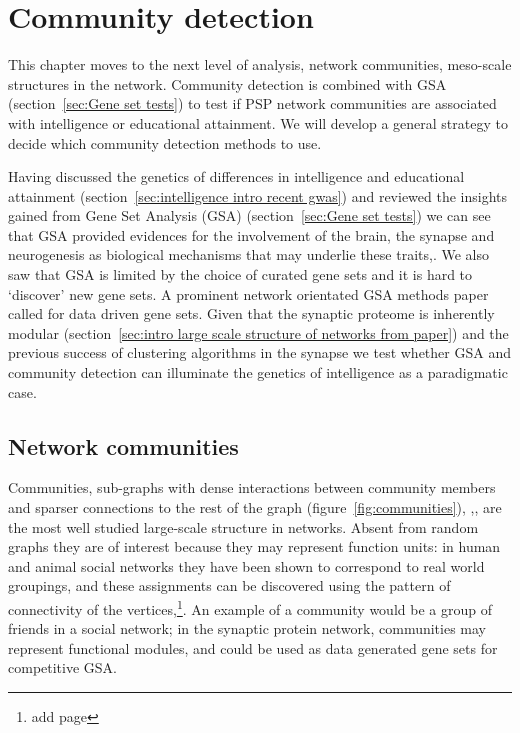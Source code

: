 
\chapter{Community detection}
\label{chap:community detection}

This chapter moves to the next level of analysis, network communities, meso-scale structures in the network. Community detection is combined with  GSA (section~\ref{sec:Gene set tests}) to test if  PSP network communities are associated with intelligence or educational attainment. We will develop a general strategy to decide which community detection methods to use. 

Having discussed the genetics of differences in intelligence and educational attainment (section~\ref{sec:intelligence intro recent gwas}) and reviewed the insights gained from Gene Set Analysis (GSA) (section~\ref{sec:Gene set tests}) we can see that GSA provided evidences for the involvement of the brain, the synapse and neurogenesis as biological mechanisms that may underlie these traits\cite{hill2014functional},\cite{hill2019combined}. We also saw that GSA is limited by the choice of curated gene sets and it is hard to `discover' new gene sets. A prominent network orientated GSA methods paper called for data driven gene sets\cite{lamparter2016fast}. Given that the synaptic proteome is inherently modular (section~\ref{sec:intro large scale structure of networks from paper}) and the previous success of clustering algorithms in the synapse we test whether GSA and community detection can illuminate the genetics of intelligence as a paradigmatic case. 





\section{Network communities}
\label{sec: community detection intro gsa}


Communities, sub-graphs with dense interactions between community members and sparser connections to the rest of the graph (figure~\ref{fig:communities}), \cite{newman2012communities},\cite{fortunato2016community},\cite{girvan2002community} are the most well studied large-scale structure in networks\cite{newman2012communities}.  Absent from random graphs they are of interest because they may represent function units: in human and animal social networks they have been shown to correspond to real world groupings, and these assignments can be discovered using the pattern of connectivity of the vertices\cite{adamic2005political},\cite{zachary1977information}\cite{newman2018networks}\footnote{add page}.  An example of a community would be a group of friends in a social network; in the synaptic protein network, communities may represent functional modules\cite{pocklington2006proteomes},\cite{mclean2016improved} and could be used as data generated gene sets for competitive GSA.  

